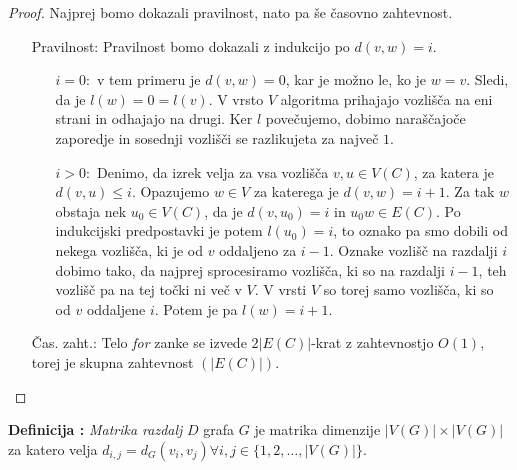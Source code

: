 \documentclass[a4paper, 10pt]{article}
\newcounter{defcount}
\newenvironment{definicija}{\begin{flushleft}\stepcounter{defcount}\textbf{Definicija \arabic{defcount}:}}{\hfill\end{flushleft}}
\newcommand{\abs}[1]{\ensuremath{\lvert #1 \rvert}}
\newcommand{\pojem}[1]{\emph{#1}}
\begin{document}
	\begin{proof}
		Najprej bomo dokazali pravilnost, nato pa še časovno zahtevnost.
		\begin{itemize}
			\item[Pravilnost:] Pravilnost bomo dokazali z indukcijo po $d(v, w) = i$. \begin{enumerate}
				\item[$i = 0:$] v tem primeru je $d(v, w) = 0$, kar je možno le, ko je $w = v$. Sledi, da je $l(w) = 0 = l(v)$. V vrsto $V$ algoritma prihajajo vozlišča na eni strani in odhajajo na drugi. Ker $l$ povečujemo, dobimo naraščajoče zaporedje in sosednji vozlišči se razlikujeta za največ $1$.
				\item[$i>0:$] Denimo, da izrek velja za vsa vozlišča $v, u \in V(C)$, za katera je $d(v, u)\leq i$. Opazujemo $w\in V$ za katerega je $d(v, w) = i+1$. Za tak $w$ obstaja nek $u_0\in V(C)$, da je $d(v, u_0) = i$ in $u_0w\in E(C)$. Po indukcijski predpostavki je potem $l(u_0)=i$, to oznako pa smo dobili od nekega vozlišča, ki je od $v$ oddaljeno za $i-1$. Oznake vozlišč na razdalji $i$ dobimo tako, da najprej sprocesiramo vozlišča, ki so na razdalji $i-1$, teh vozlišč pa na tej točki ni več v $V$. V vrsti $V$ so torej samo vozlišča, ki so od $v$ oddaljene $i$. Potem je pa $l(w) = i+1$.
			\end{enumerate}
			\item[Čas. zaht.:] Telo \pojem{for} zanke se izvede $2\abs{E(C)}$-krat z zahtevnostjo $O(1)$, torej je skupna zahtevnost $(\abs{E(C)})$.
		\end{itemize}
	\end{proof}
	\begin{definicija}
		\pojem{Matrika razdalj} $D$ grafa $G$ je matrika dimenzije $\abs{V(G)}\times\abs{V(G)}$ za katero velja $d_{i, j} = d_G(v_i, v_j) \forall i,j\in \{1, 2, \ldots, \abs{V(G)}\}$.
	\end{definicija}
	
\end{document}

